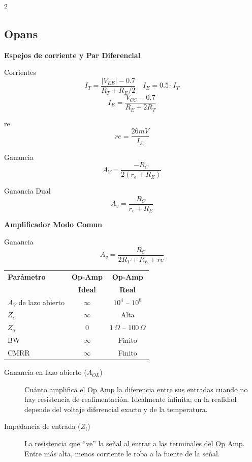 \documentclass{article}
\begin{document}
\newpage
\begin{multicols}{2}
      \subsection*{Opans}
    \textbf{Espejos de corriente y Par Diferencial}
    \begin{itemform}
    \item Corrientes
    $$I_T=\dfrac{|V_{EE}|-0.7}{R_T+R_E/2} \quad I_E=0.5 \cdot I_T $$
    $$I_E = \dfrac{V_{CC}-0.7}{R_E+2R_T}$$
    \item re
    $$re = \dfrac{26 mV}{I_E}$$
    \item Ganancia
    $$A_V=\dfrac{-R_C}{2(r_e+R_E)}$$
    \item Ganancia Dual
        $$
        A_v = \dfrac{R_C}{r_e+R_E}
        $$
    \end{itemform}
    \textbf{Amplificador Modo Comun}
    \begin{itemform}
        \item Ganancia
        $$
        A_v= \dfrac{R_C}{2R_T+R_E+re} 
        $$
        
    \end{itemform}
    

\begin{tabular}{|l|c|c|}
\hline
\textbf{Parámetro} & \textbf{Op-Amp} & \textbf{Op-Amp} \\
& \textbf{Ideal} & \textbf{Real} \\
\hline
$A_V$ de lazo abierto
& $\infty$
& $10^4$ -- $10^6$ \\
\hline
$Z_i$
& $\infty$
& Alta \\
\hline
$Z_o$
& $0$
& $1\,\Omega$ -- $100\,\Omega$ \\
\hline
BW
& $\infty$
& Finito  \\
\hline
CMRR
& $\infty$
& Finito \\
\hline
\end{tabular}

  
    
\begin{description}
    \item[Ganancia en lazo abierto ($A_{OL}$)] Cuánto amplifica el Op Amp la diferencia entre sus entradas cuando no hay resistencia de realimentación. Idealmente infinita; en la realidad depende del voltaje diferencial exacto y de la temperatura.

    \item[Impedancia de entrada ($Z_i$)] La resistencia que ``ve'' la señal al entrar a las terminales del Op Amp. Entre más alta, menos corriente le roba a la fuente de la señal.


\end{description}
\end{multicols}
\end{document}
